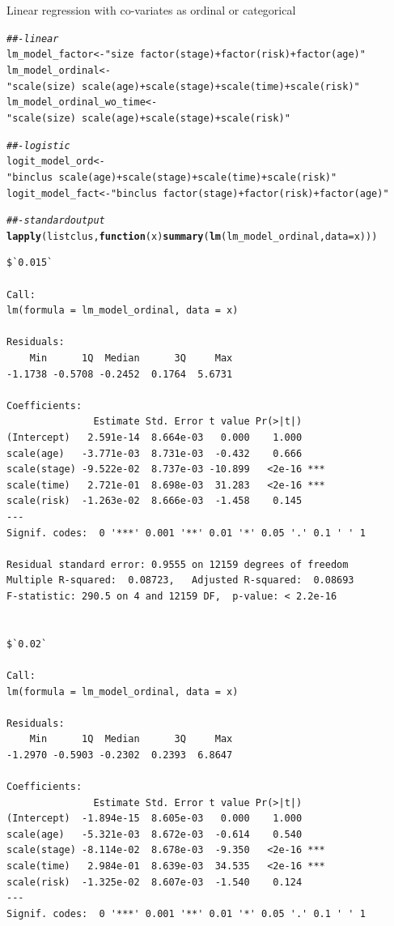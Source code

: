 \documentclass[]{revtex4}\usepackage[]{graphicx}\usepackage[]{color}
\makeatletter
\newcommand{\hlstr}[1]{\textcolor[rgb]{0.192,0.494,0.8}{#1}}%
\newcommand{\hlcom}[1]{\textcolor[rgb]{0.678,0.584,0.686}{\textit{#1}}}%
\newcommand{\hlstd}[1]{\textcolor[rgb]{0.345,0.345,0.345}{#1}}%
\newcommand{\hlkwa}[1]{\textcolor[rgb]{0.161,0.373,0.58}{\textbf{#1}}}%
\newcommand{\hlkwb}[1]{\textcolor[rgb]{0.69,0.353,0.396}{#1}}%
\newcommand{\hlkwc}[1]{\textcolor[rgb]{0.333,0.667,0.333}{#1}}%
\newcommand{\hlkwd}[1]{\textcolor[rgb]{0.737,0.353,0.396}{\textbf{#1}}}%
\newenvironment{kframe}{%
 \def\at@end@of@kframe{}%
 \ifinner\ifhmode%
  \def\at@end@of@kframe{\end{minipage}}%
  \begin{minipage}{\columnwidth}%
 \fi\fi%
 \def\FrameCommand##1{\hskip\@totalleftmargin \hskip-\fboxsep
 \colorbox{shadecolor}{##1}\hskip-\fboxsep
     \hskip-\linewidth \hskip-\@totalleftmargin \hskip\columnwidth}%
 \MakeFramed {\advance\hsize-\width
   \@totalleftmargin\z@ \linewidth\hsize
   \@setminipage}}%
 {\par\unskip\endMakeFramed%
 \at@end@of@kframe}
\newenvironment{knitrout}{}{} %
\makeatother
\begin{document}
Linear regression with co-variates as ordinal or categorical
\begin{knitrout}
\color{fgcolor}\begin{kframe}
\begin{alltt}
\hlcom{##- linear}
\hlstd{lm_model_factor} \hlkwb{<-} \hlstr{"size ~ factor(stage) + factor(risk) + factor(age)"}
\hlstd{lm_model_ordinal}  \hlkwb{<-}  \hlstr{"scale(size) ~ scale(age) + scale(stage) + scale(time) + scale(risk)"}
\hlstd{lm_model_ordinal_wo_time}  \hlkwb{<-}  \hlstr{"scale(size) ~ scale(age) + scale(stage) + scale(risk)"}

\hlcom{##- logistic}
\hlstd{logit_model_ord}  \hlkwb{<-}  \hlstr{"binclus ~ scale(age) + scale(stage) + scale(time) + scale(risk)"}
\hlstd{logit_model_fact} \hlkwb{<-}  \hlstr{"binclus ~ factor(stage) + factor(risk) + factor(age)"}

\hlcom{##- standard output}
\hlkwd{lapply}\hlstd{(listclus ,} \hlkwa{function}\hlstd{(}\hlkwc{x}\hlstd{)} \hlkwd{summary}\hlstd{(}\hlkwd{lm}\hlstd{(lm_model_ordinal,} \hlkwc{data} \hlstd{= x)))}
\end{alltt}
\begin{verbatim}
$`0.015`

Call:
lm(formula = lm_model_ordinal, data = x)

Residuals:
    Min      1Q  Median      3Q     Max 
-1.1738 -0.5708 -0.2452  0.1764  5.6731 

Coefficients:
               Estimate Std. Error t value Pr(>|t|)    
(Intercept)   2.591e-14  8.664e-03   0.000    1.000    
scale(age)   -3.771e-03  8.731e-03  -0.432    0.666    
scale(stage) -9.522e-02  8.737e-03 -10.899   <2e-16 ***
scale(time)   2.721e-01  8.698e-03  31.283   <2e-16 ***
scale(risk)  -1.263e-02  8.666e-03  -1.458    0.145    
---
Signif. codes:  0 '***' 0.001 '**' 0.01 '*' 0.05 '.' 0.1 ' ' 1

Residual standard error: 0.9555 on 12159 degrees of freedom
Multiple R-squared:  0.08723,	Adjusted R-squared:  0.08693 
F-statistic: 290.5 on 4 and 12159 DF,  p-value: < 2.2e-16


$`0.02`

Call:
lm(formula = lm_model_ordinal, data = x)

Residuals:
    Min      1Q  Median      3Q     Max 
-1.2970 -0.5903 -0.2302  0.2393  6.8647 

Coefficients:
               Estimate Std. Error t value Pr(>|t|)    
(Intercept)  -1.894e-15  8.605e-03   0.000    1.000    
scale(age)   -5.321e-03  8.672e-03  -0.614    0.540    
scale(stage) -8.114e-02  8.678e-03  -9.350   <2e-16 ***
scale(time)   2.984e-01  8.639e-03  34.535   <2e-16 ***
scale(risk)  -1.325e-02  8.607e-03  -1.540    0.124    
---
Signif. codes:  0 '***' 0.001 '**' 0.01 '*' 0.05 '.' 0.1 ' ' 1


\end{verbatim}
\end{kframe}
\end{knitrout}
\end{document}
